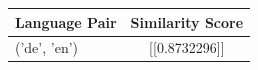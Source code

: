\begin{tabular}{|l|c|}
\hline
Language Pair & Similarity Score \\
\hline
('de', 'en') & [[0.8732296]] \\
\hline
\end{tabular}

